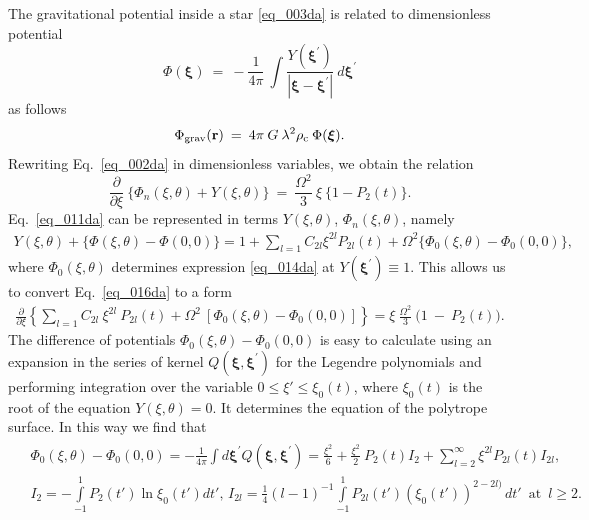 \documentclass{caosp308}
\begin{document}
The gravitational potential inside a star \eqref{eq_003da} is related to dimensionless potential
\begin{equation}
\label{eq_014da}
\Phi({\boldsymbol\xi})\:=\:-\frac{1}{4\pi}\:\int \frac{Y({\boldsymbol\xi}^{'})}{|{\boldsymbol\xi} -{\boldsymbol\xi}^{'}|}\:d{\boldsymbol\xi}^{'}
\end{equation}
as follows
\begin{equation}
\label{eq_015da}
\Phi_{\rm grav} ({\bf r})\:=\:4\pi\:G\:\lambda^2 \rho_{\rm c}\:\Phi({\boldsymbol\xi}).
\end{equation}
Rewriting Eq.~\eqref{eq_002da} in dimensionless variables, we obtain the relation
\begin{equation}
\label{eq_016da}
\frac{\partial}{\partial\xi}\:\biggl\{\Phi_n (\xi,\theta) + Y (\xi,\theta)\biggr\} \:=\:
\frac{\Omega^2}{3}\:\xi\:\biggl\{1-P_2 (t) \biggr\}.
\end{equation}
Eq.~\eqref{eq_011da} can be represented in terms $Y (\xi,\theta)$, $\Phi_n (\xi,\theta)$, namely
\begin{eqnarray}
\label{eq_017da}
Y (\xi,\theta)\!+\!\{\Phi(\xi,\theta)-\Phi(0,0)\}
\!=\!1\!+\!\sum_{l=1}\!C_{2l} \xi^{2l}\!P_{2l} (t)\!+\!\Omega^2 \bigl\{\Phi_0 (\xi,\theta)\!-\!\Phi_0 (0,0) \bigr\},
\end{eqnarray}
where $\Phi_0 (\xi,\theta)$ determines expression \eqref{eq_014da} at $Y({\boldsymbol\xi}^{'})\equiv1$. This allows us to convert Eq.~\eqref{eq_016da} to a form
\begin{eqnarray}
\label{eq_018da}
\frac{\partial}{\partial\xi}\!\left\{\sum_{l=1} C_{2l}\:\xi^{2l}\:P_{2l} (t) + \Omega^2\:[\Phi_0 (\xi,\theta)-\Phi_0 (0,0)]\right\}
=\xi\:\frac{\Omega^2}{3}\:\biggl(1\:-\:P_2 (t)\biggr).
\end{eqnarray}
The difference of potentials $\Phi_0 (\xi,\theta)-\Phi_0 (0,0)$ is easy to calculate using an expansion in the series of kernel $Q ({\boldsymbol\xi},{\boldsymbol\xi}^{'})$ for the Legendre polynomials and performing integration over the variable $0\leq\xi'\leq\xi_0(t)$, where $\xi_0(t)$ is the root of the equation $Y(\xi,\theta)=0$. It determines the equation of the polytrope surface. In this way we find that
\begin{eqnarray}
\label{eq_019da}
\begin{split}
&\Phi_0 (\xi,\theta)-\Phi_0 (0,0)=-\frac{1}{4\pi}\int d{\boldsymbol\xi}^{'}Q({\boldsymbol\xi}, {\boldsymbol\xi}^{'})
=\frac{\xi^2}{6}+\frac{\xi^2}{2}\:P_2(t)I_2+\sum\limits_{l=2}^\infty\xi^{2l}P_{2l}(t)I_{2l},\\
&I_2=-\int\limits_{-1}^{1}P_2(t')\ln\xi_{0}(t')dt',\,
I_{2l}=\frac{1}{4}(l-1)^{-1}\int\limits_{-1}^{1}P_{2l}(t')(\xi_0(t'))^{2-2l)}\,dt'\,\,\,\text{at}\,\,\,l\geq2.
\end{split}
\end{eqnarray}
\end{document}
